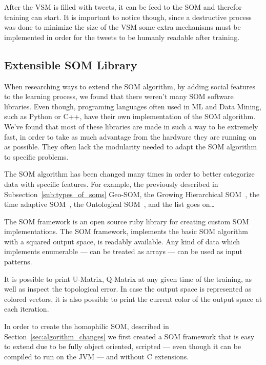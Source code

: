 After the \ac{VSM} is filled with tweets, it can be feed to the \ac{SOM} and therefor training can start. It is important to notice though, since a destructive process was done to minimize the size of the \ac{VSM} some extra mechanisms must be implemented in order for the tweets to be humanly readable after training.



\subsection{Extensible SOM Library}
\label{sub:extensible_som_library}

When researching ways to extend the \ac{SOM} algorithm, by adding social features to the learning process, we found that there weren't many \ac{SOM} software libraries. Even though, programing languages often used in \ac{ML} and Data Mining, such as Python or C++, have their own implementation of the \ac{SOM} algorithm. We've found that most of these libraries are made in such a way to be extremely fast, in order to take as much advantage from the hardware they are running on as possible. They often lack the modularity needed to adapt the \ac{SOM} algorithm to specific problems.

The \ac{SOM} algorithm has been changed many times in order to better categorize data with specific features. For example, the previously described in Subsection~\ref{sub:types_of_soms} Geo-\ac{SOM}, the Growing Hierarchical \ac{SOM}~\cite[]{1058070}, the time adaptive \ac{SOM}~\cite[]{1187438}, the Ontological \ac{SOM}~\cite[]{5446427}, and the list goes on\dots  

The \ac{SOM} framework is an open source ruby library for creating custom \ac{SOM} implementations. The \ac{SOM} framework, implements the basic \ac{SOM} algorithm with a squared output space, is readably available. Any kind of data which implements enumerable --- can be treated as arrays --- can be used as input patterns. 

It is possible to print \ac{U-Matrix}, \ac{Q-Matrix} at any given time of the training, as well as inspect the topological error. In case the output space is represented as colored vectors, it is also possible to print the current color of the output space at each iteration.

In order to create the homophilic \ac{SOM}, described in Section~\ref{sec:algorithm_changes} we first created a \ac{SOM} framework that is easy to extend due to be fully object oriented, scripted --- even though it can be compiled to run on the JVM --- and without C extensions.


